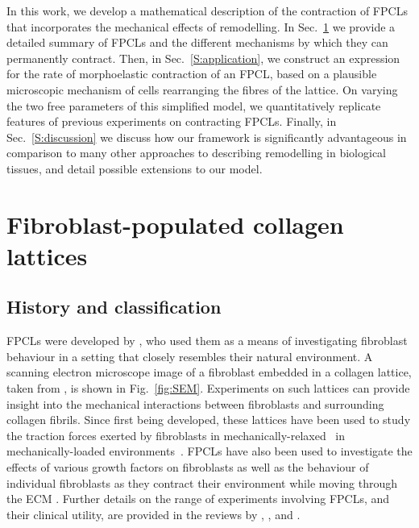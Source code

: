 In this work, we develop a mathematical description of the contraction of FPCLs that incorporates the mechanical effects of remodelling.  In Sec.~\ref{section2} we provide a detailed summary of FPCLs and the different mechanisms by which they can permanently contract. Then, in Sec.~\ref{S:application}, we construct an expression for the rate of morphoelastic contraction of an FPCL, based on a plausible microscopic mechanism of cells rearranging the fibres of the lattice. On varying the two free parameters of this simplified model, we quantitatively replicate features of previous experiments on contracting FPCLs. Finally, in Sec.~\ref{S:discussion} we discuss how our framework is significantly advantageous in comparison to many other approaches to describing remodelling in biological tissues, and detail possible extensions to our model.


\section{Fibroblast-populated collagen lattices}
\label{section2}

\subsection{History and classification}
\label{S:IntroFPCL}

FPCLs were developed by \citet{Elsdale1972}, who used them as a means of investigating fibroblast behaviour in a setting that closely resembles their natural environment. A scanning electron microscope image of a fibroblast embedded in a collagen lattice, taken from \citet{Rhee2007}, is shown in Fig.~\ref{fig:SEM}. Experiments on such lattices can provide insight into the mechanical interactions between fibroblasts and surrounding collagen fibrils. Since first being developed, these lattices have been used to study the traction forces exerted by fibroblasts in mechanically-relaxed~\citep{Bell1979,Bellows1981,Ehrlich1990} in mechanically-loaded environments~\citep{Guidry1985,Hinz2001,Mudera2000}. FPCLs have also been used to investigate the effects of various growth factors on fibroblasts \citep{Grinnell1999,Schreiber2001} as well as the behaviour of individual fibroblasts as they contract their environment while moving through the ECM \citep{Roy1997,Roy1999}. Further details on the range of experiments involving FPCLs, and their clinical utility, are provided in the reviews by \citet{Dallon2008}, \citet{Grinnell2003}, and \citet{Ehrlich2013}.

